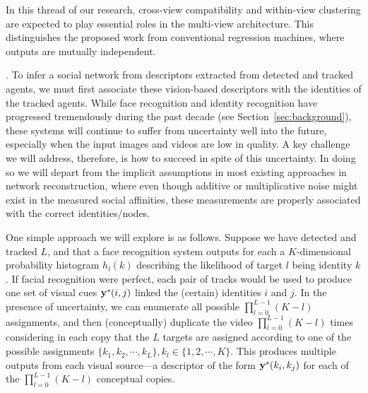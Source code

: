 In this thread of our research,  cross-view compatibility and within-view clustering are expected to play essential roles in the multi-view architecture. This distinguishes the proposed work from conventional regression machines, where outputs are mutually independent.







. To infer a social network from descriptors extracted from detected and tracked agents, we must first associate these vision-based descriptors with the identities of the tracked agents. While face recognition and identity recognition have progressed tremendously during the past decade (see Section~\ref{sec:background}), these systems will continue to suffer from uncertainty well into the future, especially when the input images and videos are low in quality. A key challenge we will address, therefore, is how to succeed in spite of this uncertainty. In doing so we will depart from the implicit assumptions in most existing approaches in network reconstruction, where even though additive or multiplicative noise might exist in the measured social affinities, these measurements are properly associated with the correct identities/nodes.

One simple approach we will explore is as follows. Suppose we have detected and tracked $L$, and that a face recognition system outputs for each a $K$-dimensional probability histogram $h_l(k)$ describing the likelihood of target $l$ being identity $k$. If facial recognition were perfect, each pair of  tracks would be used to produce one set of visual cues ${\bf y}^s(i,j)$ linked the (certain) identities $i$ and $j$. In the presence of uncertainty, we can enumerate all possible $\prod_{l=0}^{L-1}(K-l)$  assignments, and then (conceptually) duplicate the video $\prod_{l=0}^{L-1}(K-l)$ times considering in each copy that the $L$ targets are assigned according to one of the possible assignments $\{k_1, k_2, \cdots, k_L\}, k_l\in\{1,2, \cdots, K\}$. This produces multiple outputs from each visual source---a descriptor of the form ${\bf y}^s(k_i,k_j)$ for each of the $\prod_{l=0}^{L-1}(K-l)$ conceptual copies. 

